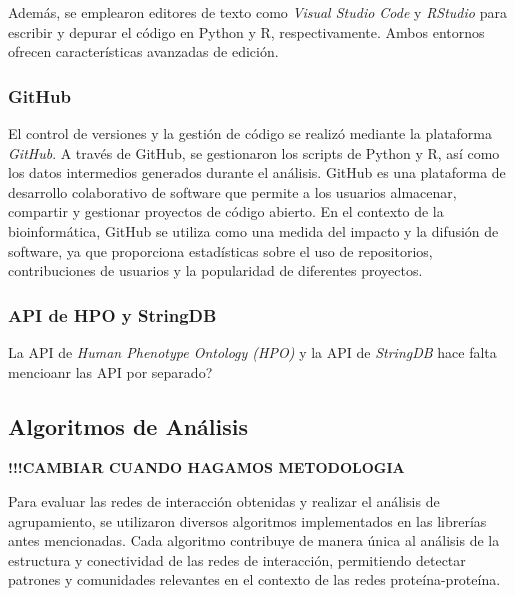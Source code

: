 Además, se emplearon editores de texto como \textit{Visual Studio Code} y \textit{RStudio} para escribir y depurar el código en Python y R, respectivamente. Ambos entornos ofrecen características avanzadas de edición.

\subsubsection{GitHub}
El control de versiones y la gestión de código se realizó mediante la plataforma \textit{GitHub}. A través de GitHub, se gestionaron los scripts de Python y R, así como los datos intermedios generados durante el análisis. GitHub es una plataforma de desarrollo colaborativo de software que permite a los usuarios almacenar, compartir y gestionar proyectos de código abierto. En el contexto de la bioinformática, GitHub se utiliza como una medida del impacto y la difusión de software, ya que proporciona estadísticas sobre el uso de repositorios, contribuciones de usuarios y la popularidad de diferentes proyectos\cite{dozmorov2018}. 


\subsubsection{API de HPO y StringDB}
La API de \textit{Human Phenotype Ontology (HPO)} y la API de \textit{StringDB} hace falta mencioanr las API por separado?

\subsection{Algoritmos de Análisis}

\textbf{!!!CAMBIAR CUANDO HAGAMOS METODOLOGIA}

Para evaluar las redes de interacción obtenidas y realizar el análisis de agrupamiento, se utilizaron diversos algoritmos implementados en las librerías antes mencionadas. Cada algoritmo contribuye de manera única al análisis de la estructura y conectividad de las redes de interacción, permitiendo detectar patrones y comunidades relevantes en el contexto de las redes proteína-proteína.
\\

